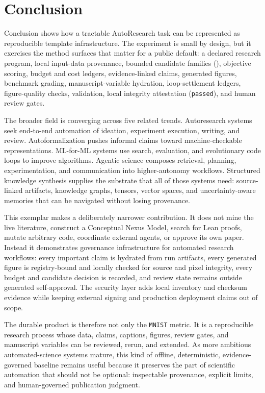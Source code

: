 \documentclass[
  ignorenonframetext,
]{beamer}
\author{\texorpdfstring{}{}}
\date{}
\begin{document}
\section{Conclusion}\label{sec:conclusion}

\begin{frame}{Conclusion}
 shows how a tractable
AutoResearch task can be represented as reproducible template
infrastructure. The
 experiment is
small by design, but it exercises the method surfaces that matter for a
public default: a declared research program, local input-data
provenance, bounded candidate families
(),
objective scoring, budget and cost ledgers, evidence-linked claims,
generated figures, benchmark grading, manuscript-variable hydration,
loop-settlement ledgers, figure-quality checks, validation, local
integrity attestation (\texttt{passed}), and human review gates.

The broader field is converging across five related trends. Autoresearch
systems seek end-to-end automation of ideation, experiment execution,
writing, and review. Autoformalization pushes informal claims toward
machine-checkable representations. ML-for-ML systems use search,
evaluation, and evolutionary code loops to improve algorithms. Agentic
science composes retrieval, planning, experimentation, and communication
into higher-autonomy workflows. Structured knowledge synthesis supplies
the substrate that all of those systems need: source-linked artifacts,
knowledge graphs, tensors, vector spaces, and uncertainty-aware memories
that can be navigated without losing provenance.

This exemplar makes a deliberately narrower contribution. It does not
mine the live literature, construct a Conceptual Nexus Model, search for
Lean proofs, mutate arbitrary code, coordinate external agents, or
approve its own paper. Instead it demonstrates governance infrastructure
for automated research workflows: every important claim is hydrated from
run artifacts, every generated figure is registry-bound and locally
checked for source and pixel integrity, every budget and candidate
decision is recorded, and review state remains outside generated
self-approval. The security layer adds local inventory and checksum
evidence while keeping external signing and production deployment claims
out of scope.

The durable product is therefore not only the \texttt{MNIST} metric. It
is a reproducible research process whose data, claims, captions,
figures, review gates, and manuscript variables can be reviewed, rerun,
and extended. As more ambitious automated-science systems mature, this
kind of offline, deterministic, evidence-governed baseline remains
useful because it preserves the part of scientific automation that
should not be optional: inspectable provenance, explicit limits, and
human-governed publication judgment.
\end{frame}
\end{document}
